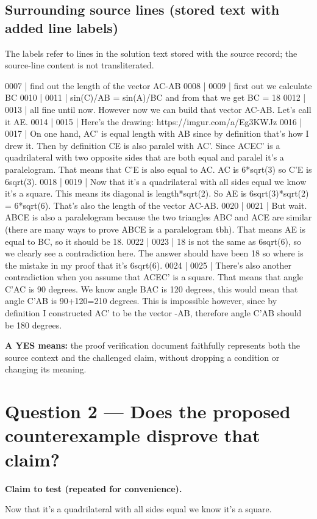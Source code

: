 \documentclass[11pt]{article}
\begin{document}
\subsection*{Surrounding source lines (stored text with added line labels)}
The labels refer to lines in the solution text stored with the source record; the source-line content is not transliterated.
\begin{Vsrc}
0007 | find out the length of the vector AC-AB
0008 | 
0009 | first out we calculate BC
0010 | 
0011 | sin(C)/AB = sin(A)/BC and from that we get BC = 18
0012 | 
0013 | all fine until now. However now we can build that vector AC-AB. Let's call it AE.
0014 | 
0015 | Here's the drawing: https://imgur.com/a/Eg3KWJz
0016 | 
0017 | On one hand, AC' is equal length with AB since by definition that's how I drew it. Then by definition CE is also paralel with AC'. Since ACEC' is a quadrilateral with two opposite sides that are both equal and paralel it's a paralelogram. That means that C'E is also equal to AC. AC is 6*sqrt(3) so C'E is 6sqrt(3). 
0018 | 
0019 | Now that it's a quadrilateral with all sides equal we know it's a square. This means its diagonal is length*sqrt(2). So AE is 6sqrt(3)*sqrt(2) = 6*sqrt(6). That's also the length of the vector AC-AB.
0020 | 
0021 | But wait. ABCE is also a paralelogram because the two triangles ABC and ACE are similar (there are many ways to prove ABCE is a paralelogram tbh). That means AE is equal to BC, so it should be 18. 
0022 | 
0023 | 18 is not the same as 6sqrt(6), so we clearly see a contradiction here. The answer should have been 18 so where is the mistake in my proof that it's 6sqrt(6).
0024 | 
0025 | There's also another contradiction when you assume that ACEC' is a square. That means that angle C'AC is 90 degrees. We know angle BAC is 120 degrees, this would mean that angle C'AB is 90+120=210 degrees. This is impossible however, since by definition I constructed AC' to be the vector -AB, therefore angle C'AB should be 180 degrees.
\end{Vsrc}
\textbf{A YES means:} the proof verification document faithfully represents both the source context and the challenged claim, without dropping a condition or changing its meaning.
\section*{Question 2 --- Does the proposed counterexample disprove that claim?}
\textbf{Claim to test (repeated for convenience).}
\begin{Vsrc}
Now that it's a quadrilateral with all sides equal we know it's a square.
\end{Vsrc}
\end{document}
